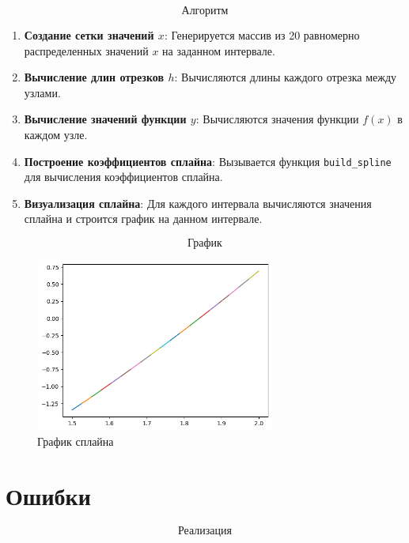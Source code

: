 \documentclass{article}
\begin{document}
$$\textbf{Алгоритм}$$
\begin{enumerate}
    \item \textbf{Создание сетки значений \( x \)}:
    Генерируется массив из 20 равномерно распределенных значений \( x \) на заданном интервале.
    
    \item \textbf{Вычисление длин отрезков \( h \)}:
    Вычисляются длины каждого отрезка между узлами.
    
    \item \textbf{Вычисление значений функции \( y \)}:
    Вычисляются значения функции \( f(x) \) в каждом узле.
    
    \item \textbf{Построение коэффициентов сплайна}:
    Вызывается функция \texttt{build\_spline} для вычисления коэффициентов сплайна.
    
    \item \textbf{Визуализация сплайна}:
    Для каждого интервала вычисляются значения сплайна и строится график на данном интервале.
\end{enumerate}
$$\textbf{График}$$
\begin{figure}[H]
    \centering
    \includegraphics[width=0.7\textwidth]{lab_5_6_1.png}
    \caption{График сплайна}
    \label{fig:my_label}
\end{figure}
\section*{Ошибки}
$$\textbf{Реализация}$$
\end{document}

